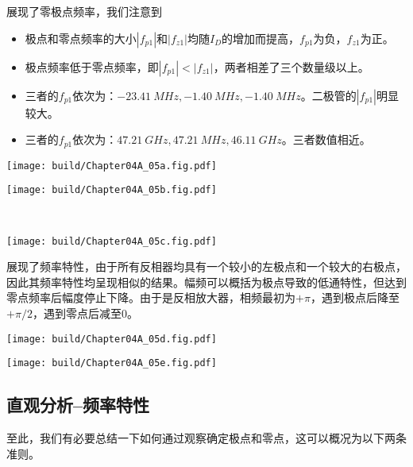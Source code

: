 展现了零极点频率，我们注意到
\begin{itemize}
    \item 极点和零点频率的大小$|f_{p1}|$和$|f_{z1}|$均随$I_D$的增加而提高，$f_{p1}$为负，$f_{z1}$为正。
    \item 极点频率低于零点频率，即$|f_{p1}|<|f_{z1}|$，两者相差了三个数量级以上。
    \item 三者的$f_{p1}$依次为：$\SI{-23.41}{MHz},\SI{-1.40}{MHz},\SI{-1.40}{MHz}$。二极管的$|f_{p1}|$明显较大。
    \item 三者的$f_{p1}$依次为：$\SI{47.21}{GHz},\SI{47.21}{MHz},\SI{46.11}{GHz}$。三者数值相近。
\end{itemize}
\begin{Figure}[反相放大器的零级点频率]
    \begin{FigureSub}
        \texttt{[image: build/Chapter04A\_05a.fig.pdf]}
    \end{FigureSub}
    \begin{FigureSub}
        \texttt{[image: build/Chapter04A\_05b.fig.pdf]}
    \end{FigureSub}\\ \vspace{0.25cm}
    \begin{FigureSub}
        \texttt{[image: build/Chapter04A\_05c.fig.pdf]}
    \end{FigureSub}
\end{Figure}

展现了频率特性，由于所有反相器均具有一个较小的左极点和一个较大的右极点，因此其频率特性均呈现相似的结果。幅频可以概括为极点导致的低通特性，但达到零点频率后幅度停止下降。由于是反相放大器，相频最初为$+\pi$，遇到极点后降至$+\pi/2$，遇到零点后减至$0$。

\begin{Figure}[反相放大器的频率特性]
    \begin{FigureSub}[幅率特性]
        \texttt{[image: build/Chapter04A\_05d.fig.pdf]}
    \end{FigureSub}
    \begin{FigureSub}[相率特性]
        \texttt{[image: build/Chapter04A\_05e.fig.pdf]}
    \end{FigureSub}
\end{Figure}

\subsection{直观分析--频率特性}
至此，我们有必要总结一下如何通过观察确定极点和零点，这可以概况为以下两条准则。

